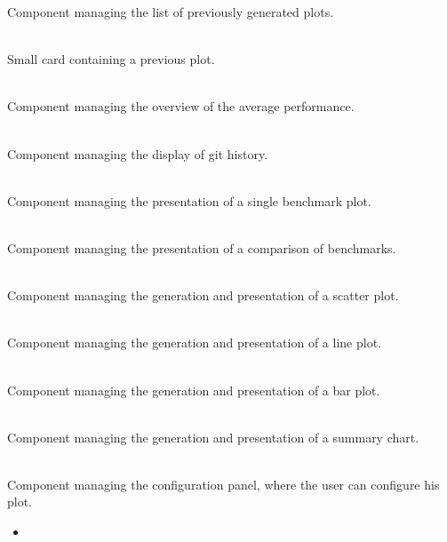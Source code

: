 \label{f:8}
{Component managing the list of previously generated plots.}
{\\}
{\\}

\label{f:9}
{Small card containing a previous plot.}
{\\}
{\\}

\label{f:10}
{Component managing the overview of the average performance.}
{\\}
{\\}

\label{f:11}
{Component managing the display of git history.}
{\\}
{\\}

\label{f:12}
{Component managing the presentation of a single benchmark plot.}
{\\}
{\\}

\label{f:13}
{Component managing the presentation of a comparison of benchmarks.}
{\\}
{\\}

\label{f:14}
{Component managing the generation and presentation of a scatter plot.}
{\\}
{\\}

\label{f:15}
{Component managing the generation and presentation of a line plot.}
{\\}
{\\}

\label{f:16}
{Component managing the generation and presentation of a bar plot.}
{\\}
{\\}

\label{f:17}
{Component managing the generation and presentation of a summary chart.}
{\\}
{\\}

\label{f:18}
{Component managing the configuration panel, where the user can configure his plot.}
{
  \begin{itemize}
      \item {}
  \end{itemize}
}
{\\}

